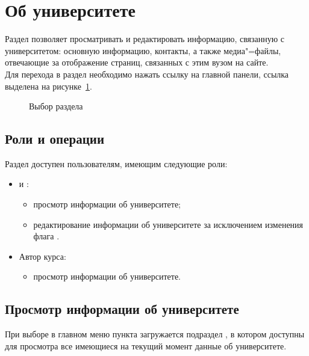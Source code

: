 \graphicspath{{images/university/}}
\section{Об университете}
	Раздел позволяет просматривать и редактировать информацию, связанную с университетом: основную информацию, контакты, а также медиа"=файлы, отвечающие за отображение страниц, связанных с этим вузом на сайте.\\
	Для перехода в раздел необходимо нажать ссылку  на главной панели, ссылка выделена на рисунке~\ref{university:section}.
	
	\begin{figure}[H]
		\caption{Выбор раздела }
		\label{university:section}
	\end{figure}
	
	\subsection{Роли и операции}
	
	Раздел доступен пользователям, имеющим следующие роли:	

	\begin{itemize}
		\item {} и :
		\begin{itemize}
			\item просмотр информации об университете;
			\item редактирование информации об университете за исключением изменения флага .
		\end{itemize}
		\item Автор курса:
		\begin{itemize}
			\item просмотр информации об университете.
		\end{itemize}
	\end{itemize} 
	
	\subsection{Просмотр информации об университете}\label{university:detail_section}
	При выборе в главном меню пункта  загружается подраздел , в котором доступны для просмотра все имеющиеся на текущий момент данные об университете.

